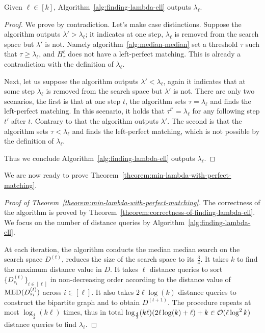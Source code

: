 \begin{theorem}
    \label{theorem:correctness-of-finding-lambda-ell}
    Given $\ell \in [k]$, Algorithm~\ref{alg:finding-lambda-ell} outputs $\lambda_{\ell}$. 
\end{theorem}
\begin{proof}
    We prove by contradiction. 
    Let's make case distinctions. 
    Suppose the algorithm outputs $\lambda' > \lambda_{\ell}$; it indicates at one step, $\lambda_{\ell}$ is removed from the search space but $\lambda'$ is not. 
    Namely algorithm~\ref{alg:median-median} set a threshold $\tau$ such that $\tau \geq \lambda_{\ell}$, and $H^{\ell}_{\tau}$ does not have a left-perfect matching. 
    This is already a contradiction with the definition of $\lambda_{\ell}$. 

    Next, let us suppose the algorithm outputs $\lambda' < \lambda_{\ell}$, again it indicates that at some step $\lambda_{\ell}$ is removed from the search space but $\lambda'$ is not. 
    There are only two scenarios, the first is that at one step $t$, the algorithm sets $\tau = \lambda_{\ell}$ and finds the left-perfect matching. In this scenario, it holds that $\tau^{t'} = \lambda_{\ell}$ for any following step $t'$ after $t$. Contrary to that the algorithm outputs $\lambda'$. 
    The second is that the algorithm sets $\tau < \lambda_{\ell}$ and finds the left-perfect matching, which is not possible by the definition of $\lambda_{\ell}$. 

    Thus we conclude Algorithm~\ref{alg:finding-lambda-ell} outputs $\lambda_{\ell}$. 
\end{proof}


We are now ready to prove Theorem~\ref{theorem:min-lambda-with-perfect-matching}.

\begin{proof}[Proof of Theorem~\ref{theorem:min-lambda-with-perfect-matching}]
    The correctness of the algorithm is proved by Theorem~\ref{theorem:correctness-of-finding-lambda-ell}.
    We focus on the number of distance queries by Algorithm~\ref{alg:finding-lambda-ell}.

    At each iteration, the algorithm conducts the median median search on the search space $D^{(t)}$, reduces the size of the search space to its $\frac{3}{4}$. 
    It takes $k$ to find the maximum distance value in $D$.
    It takes $\ell$ distance queries to sort $\{D_{s_i}^{(t)}\}_{i \in [\ell]}$ in non-decreasing order according to the distance value of $\operatorname{MED}(D_{s_i}^{(t)})$ across $i \in [\ell]$.
    It also takes $2 \ell \log(k)$ distance queries to construct the bipartite graph and to obtain $D^{(t+1)}$. 
    The procedure repeats at most $\log_{\frac{4}{3}} (k \ell)$ times, thus in total $\log_{\frac{4}{3}}(k \ell) (2 \ell \log(k) + \ell) + k \in \mathcal{O}(\ell \log^2 k)$ distance queries to find $\lambda_{\ell}$.
\end{proof}
